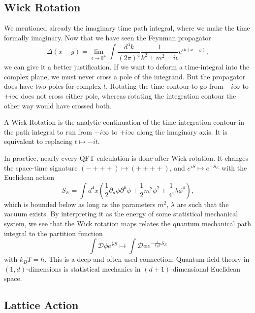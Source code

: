\documentclass[12pt]{article}
\begin{document}
\subsection{Wick Rotation}

We mentioned already the imaginary time path integral, where we make
the time formally imaginary. Now that we have seen the Feynman
propagator
\begin{equation}
  \Delta(x-y) = 
  \lim_{\epsilon \to 0^+}
  \int
  \frac{d^4k}{(2\pi)^4}
  \frac{1}{k^2 + m^2 - i \epsilon}
  e^{ik(x-y)},
\end{equation}
we can give it a better justification. If we want to deform a
time-integral into the complex plane, we must never cross a pole of
the integrand. But the propagator does have two poles for complex
$t$. Rotating the time contour to go from $-i \infty$ to $+i\infty$
does not cross either pole, whereas rotating the integration contour
the other way would have crossed both.
\begin{definition}
  A Wick Rotation is the analytic continuation of the time-integration
  contour in the path integral to run from $-i \infty$ to $+i\infty$
  along the imaginary axis. It is equivalent to replacing $t\mapsto -i
  t$.
\end{definition}
In practice, nearly every QFT calculation is done after Wick
rotation. It changes the space-time signature $(-+++) \mapsto (++++)$,
and $e^{iS} \mapsto e^{-S_E}$ with the Euclidean action
\begin{equation}
  S_E = \int d^4x \left( 
    \frac{1}{2} \partial_\mu\phi \partial^\mu \phi
    + \frac{1}{2} m^2 \phi^2 
    + \frac{1}{4!} \lambda \phi^4
  \right),
\end{equation}
which is bounded below as long as the parameters $m^2$, $\lambda$ are
such that the vacuum exists. By interpreting it as the energy of some
statistical mechanical system, we see that the Wick rotation maps
relates the quantum mechanical path integral to the partition function
\begin{equation}
  \int \mathcal{D}\phi e^{\frac{i}{\hbar}S} 
  \mapsto
  \int \mathcal{D}\phi e^{-\frac{1}{k_B T}S_E} 
\end{equation}
with $k_B T=\hbar$. This is a deep and often-used connection: Quantum
field theory in $(1,d)$-dimensions is statistical mechanics in
$(d+1)$-dimensional Euclidean space.


\subsection{Lattice Action}
\end{document}
